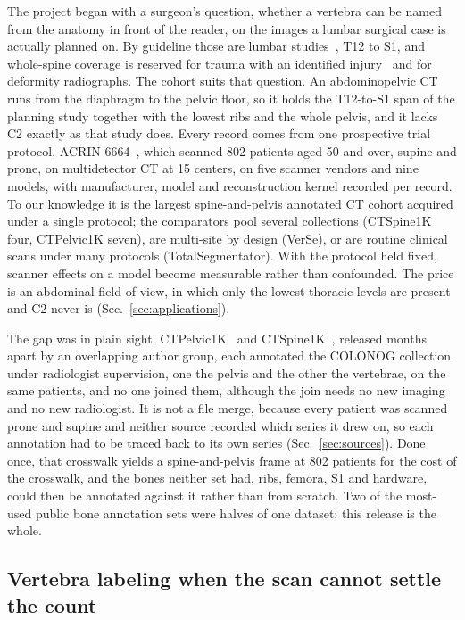 \documentclass[aapm,mph,amsmath,amssymb,reprint]{revtex4-2}
\begin{document}
The project began with a surgeon's question, whether a vertebra can be named from the anatomy in front of the reader, on the images a lumbar surgical case is actually planned on. By guideline those are lumbar studies~\cite{acr2021,nass2013,acrmri2023}, T12 to S1, and whole-spine
coverage is reserved for trauma with an identified injury~\cite{tqip2018} and for deformity
radiographs. The cohort suits that question. An abdominopelvic CT runs from the diaphragm to the pelvic
floor, so it holds the T12-to-S1 span of the planning study together with the lowest ribs
and the whole pelvis, and it lacks C2 exactly as that study does. Every record
comes from one prospective trial protocol, ACRIN 6664~\cite{colonog,tcia}, which scanned 802 patients aged 50 and over, supine and prone, on multidetector CT at 15 centers, on five scanner
vendors and nine models, with manufacturer, model and reconstruction kernel recorded per
record. To our knowledge it is the largest spine-and-pelvis annotated CT cohort acquired
under a single protocol; the comparators pool several collections (CTSpine1K four,
CTPelvic1K seven), are multi-site by design (VerSe), or are routine clinical scans under
many protocols (TotalSegmentator). With the protocol held fixed, scanner effects on a
model become measurable rather than confounded. The price is an abdominal field of view, in which only the lowest thoracic levels are present and C2 never is (Sec.~\ref{sec:applications}).

The gap was in plain sight. CTPelvic1K~\cite{ctpelvic1k} and CTSpine1K~\cite{ctspine1k},
released months apart by an overlapping author group, each annotated the COLONOG
collection under radiologist supervision, one the pelvis and the other the vertebrae, on the
same patients, and no one joined them, although the join needs no new imaging and no new
radiologist. It is not a file merge, because every patient was scanned prone and supine and neither
source recorded which series it drew on, so each annotation had to be traced back to its
own series (Sec.~\ref{sec:sources}). Done once, that crosswalk yields a spine-and-pelvis
frame at 802 patients for the cost of the crosswalk, and the bones neither set had, ribs, femora,
S1 and hardware, could then be annotated against it rather than from scratch. Two of the
most-used public bone annotation sets were halves of one dataset; this release is the whole.



\subsection{Vertebra labeling when the scan cannot settle the count}
\end{document}
